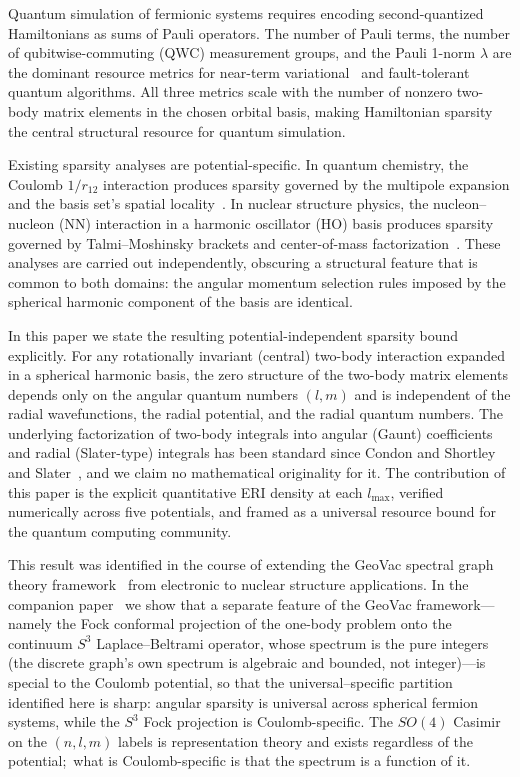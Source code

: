 \documentclass[twocolumn,pra,amsmath,amssymb,superscriptaddress]{revtex4-2}
\begin{document}
Quantum simulation of fermionic systems requires encoding
second-quantized Hamiltonians as sums of Pauli operators.  The
number of Pauli terms, the number of qubitwise-commuting (QWC)
measurement groups, and the Pauli 1-norm $\lambda$ are the dominant
resource metrics for near-term variational~\cite{Peruzzo2014} and
fault-tolerant~\cite{Lee2021} quantum algorithms.  All three metrics
scale with the number of nonzero two-body matrix elements in the
chosen orbital basis, making Hamiltonian sparsity the central
structural resource for quantum simulation.

Existing sparsity analyses are potential-specific.  In quantum
chemistry, the Coulomb $1/r_{12}$ interaction produces sparsity
governed by the multipole expansion and the basis set's spatial
locality~\cite{Whitten1973, Dunlap2000}.  In nuclear structure
physics, the nucleon--nucleon (NN) interaction in a harmonic
oscillator (HO) basis produces sparsity governed by
Talmi--Moshinsky brackets and center-of-mass
factorization~\cite{Suhonen2007}.  These analyses are carried out
independently, obscuring a structural feature that is common to both
domains: the angular momentum selection rules imposed by the
spherical harmonic component of the basis are identical.

In this paper we state the resulting potential-independent sparsity
bound explicitly.  For any rotationally invariant (central) two-body
interaction expanded in a spherical harmonic basis, the zero
structure of the two-body matrix elements depends only on the
angular quantum numbers $(l, m)$ and is independent of the radial
wavefunctions, the radial potential, and the radial quantum numbers.
The underlying factorization of two-body integrals into angular
(Gaunt) coefficients and radial (Slater-type) integrals has been
standard since Condon and Shortley~\cite{CondonShortley1935} and
Slater~\cite{Slater1960}, and we claim no mathematical originality
for it.  The contribution of this paper is the explicit quantitative
ERI density at each $l_{\max}$, verified numerically across five
potentials, and framed as a universal resource bound for the quantum
computing community.

This result was identified in the course of extending the GeoVac
spectral graph theory framework~\cite{GeoVac_Paper7, GeoVac_Paper14}
from electronic to nuclear structure applications.  In the
companion paper~\cite{GeoVac_Paper23} we show that a separate
feature of the GeoVac framework---namely the Fock conformal
projection of the one-body problem onto the continuum $S^3$
Laplace--Beltrami operator, whose spectrum is the pure integers
(the discrete graph's own spectrum is algebraic and bounded, not
integer)---is
special to the Coulomb potential, so that the universal--specific
partition identified here is sharp: angular sparsity is universal
across spherical fermion systems, while the $S^3$ Fock projection is
Coulomb-specific.  The $SO(4)$ Casimir on the $(n,l,m)$ labels is
representation theory and exists regardless of the potential;\ what is
Coulomb-specific is that the spectrum is a function of it.
\end{document}
